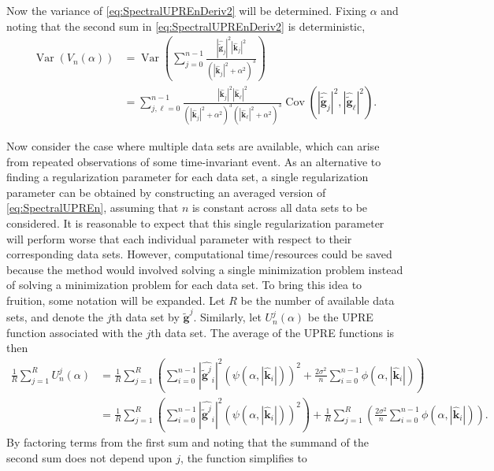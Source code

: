 \documentclass[12pt]{article}
\newcommand{\gnoise}{\widetilde{\mathbf{g}}}
\newcommand{\kdis}{\mathbf{k}}
\newcommand{\regparam}{\alpha}
\newcommand{\filt}{\phi}
\newcommand{\mfilt}{\psi}
\newcommand{\noiseSD}{\sigma}	%
\newcommand{\Var}{\operatorname{Var}}	%
\newcommand{\Cov}{\operatorname{Cov}}	%
\newcommand{\U}{U}	%
\begin{document}
Now the variance of \eqref{eq:SpectralUPREnDeriv2} will be determined. Fixing $\regparam$ and noting that the second sum in \eqref{eq:SpectralUPREnDeriv2} is deterministic,
\begin{align*}
\Var\left(V_n(\regparam)\right) &= \Var\left(\sum_{j = 0}^{n-1} \frac{|\widehat{\gnoise}_j|^2|\widehat{\kdis}_j|^2}{(|\widehat{\kdis}_j|^2 + \regparam^2)^3}\right) \\
&= \sum_{j,\ell = 0}^{n-1} \frac{|\widehat{\kdis}_j|^2|\widehat{\kdis}_\ell|^2}{(|\widehat{\kdis}_j|^2 + \regparam^2)^3(|\widehat{\kdis}_\ell|^2 + \regparam^2)^3}\Cov\left(|\widehat{\gnoise}_j|^2,|\widehat{\gnoise}_\ell|^2\right). 
\end{align*}


\par 
Now consider the case where multiple data sets are available, which can arise from repeated observations of some time-invariant event. As an alternative to finding a regularization parameter for each data set, a single regularization parameter can be obtained by constructing an averaged version of \eqref{eq:SpectralUPREn}, assuming that $n$ is constant across all data sets to be considered. It is reasonable to expect that this single regularization parameter will perform worse that each individual parameter with respect to their corresponding data sets. However, computational time/resources could be saved because the method would involved solving a single minimization problem instead of solving a minimization problem for each data set. To bring this idea to fruition, some notation will be expanded. Let $R$ be the number of available data sets, and denote the $j$th data set by $\gnoise^j$. Similarly, let $\U_n^j(\regparam)$ be the UPRE function associated with the $j$th data set.  The average of the UPRE functions is then 
\begin{align*}
\frac{1}{R}\sum_{j=1}^R \U_n^j(\regparam) &= \frac{1}{R}\sum_{j=1}^R \left(\sum_{i = 0}^{n-1} |\widehat{\gnoise^j}_i|^2(\mfilt(\regparam,|\widehat{\kdis}_i|))^2 + \frac{2\noiseSD^2}{n}\sum_{i = 0}^{n-1} \filt(\regparam,|\widehat{\kdis}_i|)\right) \\
&= \frac{1}{R}\sum_{j=1}^R \left(\sum_{i = 0}^{n-1} |\widehat{\gnoise^j}_i|^2(\mfilt(\regparam,|\widehat{\kdis}_i|))^2\right) + \frac{1}{R}\sum_{j=1}^R \left(\frac{2\noiseSD^2}{n}\sum_{i = 0}^{n-1} \filt(\regparam,|\widehat{\kdis}_i|)\right).
\end{align*}
By factoring terms from the first sum and noting that the summand of the second sum does not depend upon $j$, the function simplifies to
\end{document}
